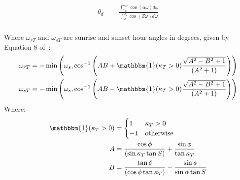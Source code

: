 \documentclass[11pt]{article}
\begin{document}
\begin{enumerate}
\newcommand\ddfrac[2]{\frac{\displaystyle #1}{\displaystyle #2}}

\begin{align*}
\theta_d &= \ddfrac{\int_{\omega_{rT}}^{\omega_{sT}} \cos \left(\alpha \omega\right) d \omega}{\int_{\omega_{r}}^{\omega_{s}} \cos \left(Z \omega\right) d \omega} \\
\end{align*}

Where $\omega_{rT}$ and $\omega_{sT}$ are sunrise and sunset hour angles in degrees, given by Equation 8 of~\citet{kamali2006estimating}:
\begin{align*}
\omega_{rT} &= - \min\left(\omega_s, \cos^{-1} \left( AB + \mathbbm{1}(\kappa_T > 0)\frac{\sqrt{A^2 - B^2 + 1}}{(A^2 + 1)}\right)\right) \\
\omega_{sT} &= - \min\left(\omega_s, \cos^{-1} \left( AB - \mathbbm{1}(\kappa_T > 0)\frac{\sqrt{A^2 - B^2 + 1}}{(A^2 + 1)}\right)\right)
\end{align*}
Where:
\begin{align*}
\mathbbm{1}(\kappa_T > 0) &= \begin{cases}
1& \kappa_T > 0 \\
-1& \text{otherwise}
\end{cases} \\
A &= \frac{\cos \phi}{(\sin \kappa_T \tan S)} + \frac{\sin \phi}{\tan \kappa_T} \\
B &= \frac{\tan \delta}{(\cos \phi \tan \kappa_T)} - \frac{\sin \phi}{\sin \alpha \tan S}
\end{align*}

\end{enumerate}

\end{document}
